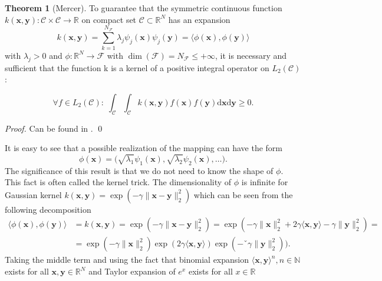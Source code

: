 \documentclass[11pt,oneside,czech,american]{book} %
\theoremstyle{definition} %
\newtheorem{thm}{Theorem}
\theoremstyle{definition}
\begin{document}
\begin{thm}[Mercer]
	To guarantee that the symmetric continuous function $k(\bm{x}, \bm{y}): \mathcal{C} \times \mathcal{C} \rightarrow \mathbb{R}$ on compact set $\mathcal{C} \subset \mathbb{R}^N$ has an expansion
	\begin{equation}
		k(\bm{x}, \bm{y}) = \sum_{k=1}^{N_{\mathcal{F}}} \lambda_j \psi_j(\bm{x}) \psi_j(\bm{y}) = \langle \phi(\bm{x}), \phi(\bm{y}) \rangle
	\end{equation}
	with $\lambda_j >0$ and $\phi: \mathbb{R}^N \rightarrow \mathcal{F}$ with $\dim(\mathcal{F}) = N_{\mathcal{F}} \leq + \infty$, it is necessary and sufficient that  the function k is a kernel of a positive integral operator on $L_2 (\mathcal{C})$:
	
	\begin{equation}
		\forall f \in L_2 (\mathcal{C}): \; \int_{\mathcal{C}} \int_{\mathcal{C}} k(\bm{x}, \bm{y}) f(\bm{x}) f(\bm{y}) \text{d}\bm{x} \text{d}\bm{y} \geq 0.
	\end{equation}
\end{thm}

\emph{Proof.} Can be found in \parencite{mercer09}. \qed


It is easy to see that a possible realization of the mapping can have the form $$\phi(\bm{x}) = \Big(\sqrt{\lambda_1}\psi_1(\bm{x}), \sqrt{\lambda_2}\psi_2(\bm{x}), \dots \Big).$$
The significance of this result is that we do not need to know the shape of $\phi$. This fact is often called the kernel trick. The dimensionality of $\phi$ is infinite for Gaussian kernel $k(\bm{x}, \bm{y}) = \exp(- \gamma\| \bm{x} - \bm{y} \|^2_2)$ which can be seen from the following decomposition
\begin{equation}
	\begin{aligned}
		\langle \phi(\bm{x}), \phi(\bm{y}) \rangle &= k(\bm{x}, \bm{y}) = \exp(- \gamma\| \bm{x} - \bm{y} \|^2_2)=\exp(-\gamma \|\bm{x} \|^2_2 + 2\gamma \langle \bm{x}, \bm{y} \rangle - \gamma \|\bm{y} \|^2_2) = \\ &= \exp(-\gamma \|\bm{x} \|^2_2)\exp(2\gamma \langle \bm{x}, \bm{y} \rangle )\exp(-ˇ\gamma \|\bm{y} \|^2_2) ).
	\end{aligned}
\end{equation}
Taking the middle term and using the fact that binomial expansion $\langle \bm{x}, \bm{y}\rangle^n, n \in \mathbb{N}$ exists for all $\bm{x}, \bm{y} \in \mathbb{R}^N$ and Taylor expansion of $e^x$ exists for all $x \in \mathbb{R}$
\end{document}
